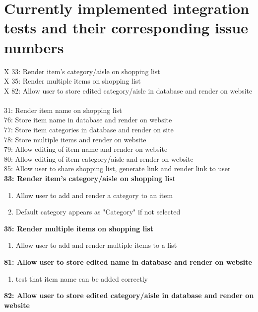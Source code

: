 \documentclass[10pt,onecolumn]{witseiepaper}
\begin{document}
\section{Currently implemented integration tests and their corresponding issue numbers}

X 33: Render item's category/aisle on shopping list ~\\
X 35: Render multiple items on shopping list ~\\
X 82: Allow user to store edited category/aisle in database and render on website ~\\
31: Render item name on shopping list ~\\
76: Store item name in database and render on website ~\\
77: Store item categories in database and render on site ~\\
78: Store multiple items and render on website ~\\
79: Allow editing of item name and render on website ~\\
80: Allow editing of item category/aisle and render on website ~\\
85: Allow user to share shopping list, generate link and render link to user ~\\


\textbf{33: Render item's category/aisle on shopping list}

\begin{enumerate}
	\item Allow user to add and render a category to an item
	\item Default category appears as "Category" if not selected
\end{enumerate}

\textbf{35: Render multiple items on shopping list}

\begin{enumerate}
	\item Allow user to add and render multiple items to a list
\end{enumerate}

\textbf{81: Allow user to store edited name in database and render on website}

\begin{enumerate}
	\item test that item name can be added correctly
\end{enumerate}

\textbf{82: Allow user to store edited category/aisle in database and render on website}
\end{document}

